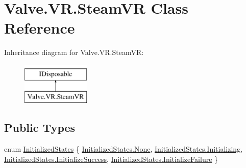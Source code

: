\hypertarget{class_valve_1_1_v_r_1_1_steam_v_r}{}\section{Valve.\+V\+R.\+Steam\+VR Class Reference}
\label{class_valve_1_1_v_r_1_1_steam_v_r}
Inheritance diagram for Valve.\+V\+R.\+Steam\+VR\+:\begin{figure}[H]
\begin{center}
\leavevmode
\includegraphics[height=2.000000cm]{class_valve_1_1_v_r_1_1_steam_v_r}
\end{center}
\end{figure}
\subsection*{Public Types}
\begin{DoxyCompactItemize}
\item 
enum \mbox{\hyperlink{class_valve_1_1_v_r_1_1_steam_v_r_a09db867d75bbc654801bb318dd85a5e3}{Initialized\+States}} \{ \mbox{\hyperlink{class_valve_1_1_v_r_1_1_steam_v_r_a09db867d75bbc654801bb318dd85a5e3a6adf97f83acf6453d4a6a4b1070f3754}{Initialized\+States.\+None}}, 
\mbox{\hyperlink{class_valve_1_1_v_r_1_1_steam_v_r_a09db867d75bbc654801bb318dd85a5e3a32b169f72b293ef80d35435e9894f8e2}{Initialized\+States.\+Initializing}}, 
\mbox{\hyperlink{class_valve_1_1_v_r_1_1_steam_v_r_a09db867d75bbc654801bb318dd85a5e3a5ff788cb6e22c2ece55860d907a7b530}{Initialized\+States.\+Initialize\+Success}}, 
\mbox{\hyperlink{class_valve_1_1_v_r_1_1_steam_v_r_a09db867d75bbc654801bb318dd85a5e3a226a41268bebbb698ea4d7d19f1a81f2}{Initialized\+States.\+Initialize\+Failure}}
 \}
\end{DoxyCompactItemize}
